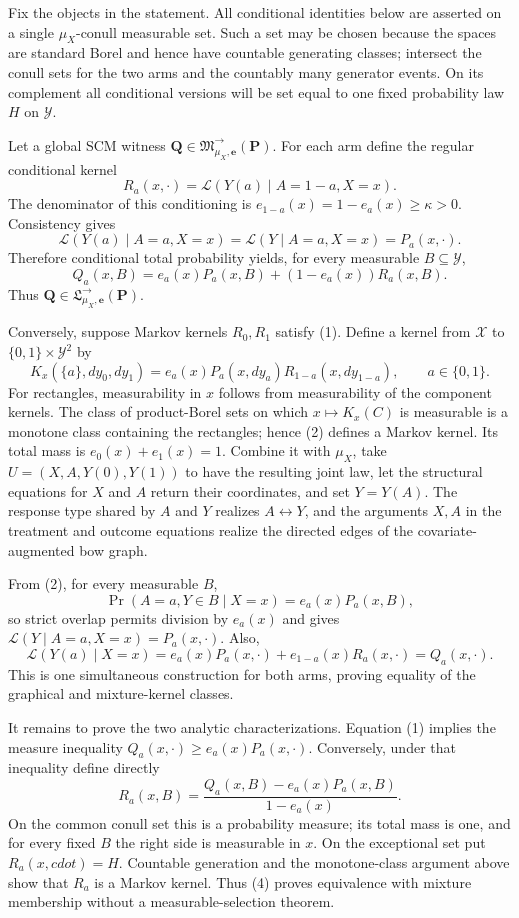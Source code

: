 Fix the objects in the statement.  All conditional identities below are asserted on a single \(\mu_X\)-conull measurable set.  Such a set may be chosen because the spaces are standard Borel and hence have countable generating classes; intersect the conull sets for the two arms and the countably many generator events.  On its complement all conditional versions will be set equal to one fixed probability law \(H\) on \(\mathcal Y\).

Let a global SCM witness \(\boldsymbol Q\in\mathfrak M^{\to}_{\mu_X,\boldsymbol e}(\boldsymbol P)\).  For each arm define the regular conditional kernel
\[
 R_a(x,\cdot)=\mathcal L(Y(a)\mid A=1-a,X=x).
\]
The denominator of this conditioning is \(e_{1-a}(x)=1-e_a(x)\ge\kappa>0\).  Consistency gives
\[
 \mathcal L(Y(a)\mid A=a,X=x)=\mathcal L(Y\mid A=a,X=x)=P_a(x,\cdot).
\]
Therefore conditional total probability yields, for every measurable \(B\subseteq\mathcal Y\),
\[
 Q_a(x,B)=e_a(x)P_a(x,B)+(1-e_a(x))R_a(x,B). \tag{1}
\]
Thus \(\boldsymbol Q\in\mathfrak L^{\to}_{\mu_X,\boldsymbol e}(\boldsymbol P)\).

Conversely, suppose Markov kernels \(R_0,R_1\) satisfy (1).  Define a kernel from \(\mathcal X\) to \(\{0,1\}\times\mathcal Y^2\) by
\[
 K_x(\{a\},dy_0,dy_1)
 =e_a(x)P_a(x,dy_a)R_{1-a}(x,dy_{1-a}),\qquad a\in\{0,1\}. \tag{2}
\]
For rectangles, measurability in \(x\) follows from measurability of the component kernels.  The class of product-Borel sets on which \(x\mapsto K_x(C)\) is measurable is a monotone class containing the rectangles; hence (2) defines a Markov kernel.  Its total mass is \(e_0(x)+e_1(x)=1\).  Combine it with \(\mu_X\), take \(U=(X,A,Y(0),Y(1))\) to have the resulting joint law, let the structural equations for \(X\) and \(A\) return their coordinates, and set \(Y=Y(A)\).  The response type shared by \(A\) and \(Y\) realizes \(A\leftrightarrow Y\), and the arguments \(X,A\) in the treatment and outcome equations realize the directed edges of the covariate-augmented bow graph.

From (2), for every measurable \(B\),
\[
 \Pr(A=a,Y\in B\mid X=x)=e_a(x)P_a(x,B),
\]
so strict overlap permits division by \(e_a(x)\) and gives \(\mathcal L(Y\mid A=a,X=x)=P_a(x,\cdot)\).  Also,
\[
 \mathcal L(Y(a)\mid X=x)
 =e_a(x)P_a(x,\cdot)+e_{1-a}(x)R_a(x,\cdot)
 =Q_a(x,\cdot). \tag{3}
\]
This is one simultaneous construction for both arms, proving equality of the graphical and mixture-kernel classes.

It remains to prove the two analytic characterizations.  Equation (1) implies the measure inequality \(Q_a(x,\cdot)\ge e_a(x)P_a(x,\cdot)\).  Conversely, under that inequality define directly
\[
 R_a(x,B)=\frac{Q_a(x,B)-e_a(x)P_a(x,B)}{1-e_a(x)}. \tag{4}
\]
On the common conull set this is a probability measure; its total mass is one, and for every fixed \(B\) the right side is measurable in \(x\).  On the exceptional set put \(R_a(x,cdot)=H\).  Countable generation and the monotone-class argument above show that \(R_a\) is a Markov kernel.  Thus (4) proves equivalence with mixture membership without a measurable-selection theorem.

